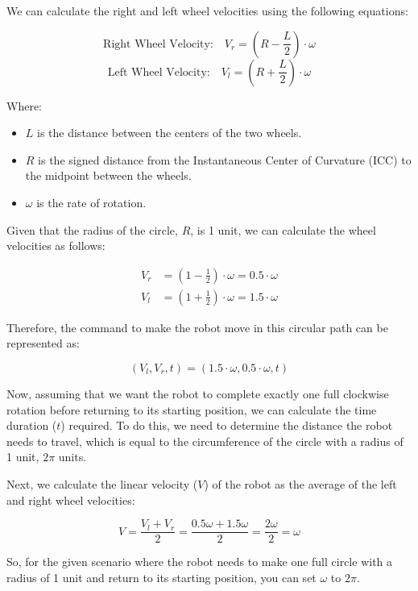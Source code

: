 \documentclass[answers]{exam}
\begin{document}
\begin{questions}
\begin{parts}
\begin{solution}
            We can calculate the right and left wheel velocities using the following
            equations:

            \[\text{Right Wheel Velocity:} \quad V_r = (R - \frac{L}{2}) \cdot \omega\]
            \[\text{Left Wheel Velocity:} \quad V_l = (R + \frac{L}{2}) \cdot \omega\]

            Where:
            \begin{itemize}
                \item \(L\) is the distance between the centers of the two wheels.
                \item \(R\) is the signed distance from the Instantaneous Center of Curvature (ICC) to the midpoint between the wheels.
                \item \(\omega\) is the rate of rotation.
            \end{itemize}

            Given that the radius of the circle, \(R\), is 1 unit, we can calculate the
            wheel velocities as follows:

            \begin{align*}
                V_r & = (1 - \frac{1}{2}) \cdot \omega = 0.5 \cdot \omega \\
                V_l & = (1 + \frac{1}{2}) \cdot \omega = 1.5 \cdot \omega
            \end{align*}

            Therefore, the command to make the robot move in this circular path can be
            represented as:

            \[(V_l, V_r, t) = (1.5\cdot\omega, 0.5\cdot\omega, t)\]

            Now, assuming that we want the robot to complete exactly one full clockwise
            rotation before returning to its starting position, we can calculate the time
            duration (\(t\)) required. To do this, we need to determine the distance the
            robot needs to travel, which is equal to the circumference of the circle with a
            radius of 1 unit, \(2\pi\) units.

            Next, we calculate the linear velocity (\(V\)) of the robot as the average of
            the left and right wheel velocities:

            \[V = \frac{V_l + V_r}{2} = \frac{0.5\omega + 1.5\omega}{2} = \frac{2\omega}{2} = \omega\]

            So, for the given scenario where the robot needs to make one full circle with a
            radius of 1 unit and return to its starting position, you can set \(\omega\) to
            \(2\pi\).


\end{solution}
\end{parts}
\end{questions}
\end{document}
